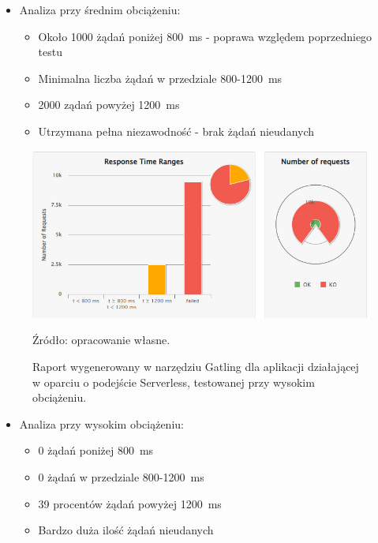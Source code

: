 \documentclass[runningheads,12pt]{llncs}
\begin{document}
\begin{itemize}
  \item Analiza przy średnim obciążeniu:
  \begin{itemize}
    \item Około 1000 żądań poniżej 800~ms - poprawa względem poprzedniego testu
    \item Minimalna liczba żądań w przedziale 800-1200~ms
    \item 2000 ządań powyżej 1200~ms
    \item Utrzymana pełna niezawodność - brak żądań nieudanych
  \end{itemize}
\end{itemize}

\newpage

\begin{figure}
    \includegraphics[width=\linewidth]{images/serverless-gatling-high-graph.jpg}
    \caption{Raport wygenerowany w narzędziu Gatling dla aplikacji działającej w oparciu o podejście Serverless, testowanej przy wysokim obciążeniu.} \label{fig3}
    \vspace{0.5em}
    {\small Źródło: opracowanie własne.}
\end{figure}

\begin{itemize}
  \item Analiza przy wysokim obciążeniu:
  \begin{itemize}
    \item 0 żądań poniżej 800~ms
    \item 0 żądań w przedziale 800-1200~ms
    \item 39 procentów żądań powyżej 1200~ms
    \item Bardzo duża ilość żądań nieudanych
  \end{itemize}
\end{itemize}
\end{document}
